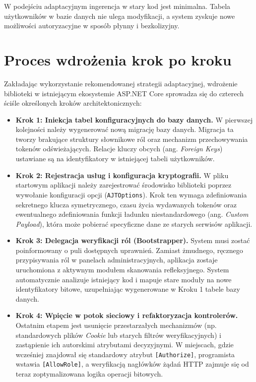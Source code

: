 \documentclass{SGGW-thesis}
\begin{document}
W podejściu adaptacyjnym ingerencja w stary kod jest minimalna. Tabela użytkowników w bazie danych nie ulega modyfikacji, a system zyskuje nowe możliwości autoryzacyjne w sposób płynny i bezkolizyjny.

\clearpage

\section{Proces wdrożenia krok po kroku}

Zakładając wykorzystanie rekomendowanej strategii adaptacyjnej, wdrożenie biblioteki w istniejącym ekosystemie ASP.NET Core sprowadza się do czterech ściśle określonych kroków architektonicznych:

\begin{itemize}
    \item \textbf{Krok 1: Iniekcja tabel konfiguracyjnych do bazy danych.} W pierwszej kolejności należy wygenerować nową migrację bazy danych. Migracja ta tworzy brakujące struktury słownikowe ról oraz mechanizm przechowywania tokenów odświeżających. Relacje kluczy obcych (ang. \textit{Foreign Keys}) ustawiane są na identyfikatory w istniejącej tabeli użytkowników.
    
    \item \textbf{Krok 2: Rejestracja usług i konfiguracja kryptografii.} W pliku startowym aplikacji należy zarejestrować środowisko biblioteki poprzez wywołanie konfiguracji opcji (\texttt{AJTOptions}). Krok ten wymaga zdefiniowania sekretnego klucza symetrycznego, czasu życia wydawanych tokenów oraz ewentualnego zdefiniowania funkcji ładunku niestandardowego (ang. \textit{Custom Payload}), która może pobierać specyficzne dane ze starych serwisów aplikacji.
    
    \item \textbf{Krok 3: Delegacja weryfikacji ról (Bootstrapper).} System musi zostać poinformowany o puli dostępnych uprawnień. Zamiast żmudnego, ręcznego przypisywania ról w panelach administracyjnych, aplikacja zostaje uruchomiona z aktywnym modułem skanowania refleksyjnego. System automatycznie analizuje istniejący kod i mapuje stare moduły na nowe identyfikatory bitowe, uzupełniając wygenerowane w Kroku 1 tabele bazy danych.
    
    \item \textbf{Krok 4: Wpięcie w potok sieciowy i refaktoryzacja kontrolerów.} Ostatnim etapem jest usunięcie przestarzałych mechanizmów (np. standardowych plików \textit{Cookie} lub starych filtrów weryfikacyjnych) i zastąpienie ich autorskimi atrybutami decyzyjnymi. W miejscach, gdzie wcześniej znajdował się standardowy atrybut \texttt{[Authorize]}, programista wstawia \texttt{[AllowRole]}, a weryfikacją nagłówków żądań HTTP zajmuje się od teraz zoptymalizowana logika operacji bitowych.
\end{itemize}
\end{document}
